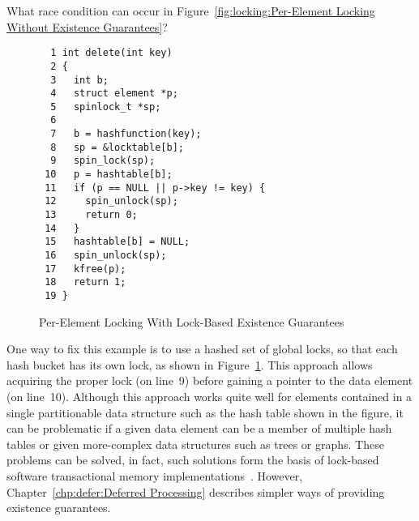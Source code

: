 \QuickQuiz{}
	What race condition can occur in
	Figure~\ref{fig:locking:Per-Element Locking Without Existence Guarantees}?
 \QuickQuizEnd

\begin{figure}[tbp]
{ \scriptsize
\begin{verbatim}
  1 int delete(int key)
  2 {
  3   int b;
  4   struct element *p;
  5   spinlock_t *sp;
  6
  7   b = hashfunction(key);
  8   sp = &locktable[b];
  9   spin_lock(sp);
 10   p = hashtable[b];
 11   if (p == NULL || p->key != key) {
 12     spin_unlock(sp);
 13     return 0;
 14   }
 15   hashtable[b] = NULL;
 16   spin_unlock(sp);
 17   kfree(p);
 18   return 1;
 19 }
\end{verbatim}
}
\caption{Per-Element Locking With Lock-Based Existence Guarantees}
\label{fig:locking:Per-Element Locking With Lock-Based Existence Guarantees}
\end{figure}

One way to fix this example is to use a hashed set of global locks, so
that each hash bucket has its own lock, as shown in
Figure~\ref{fig:locking:Per-Element Locking With Lock-Based Existence Guarantees}.
This approach allows acquiring the proper lock (on line~9) before
gaining a pointer to the data element (on line~10).
Although this approach works quite well for elements contained in a
single partitionable data structure such as the hash table shown in the
figure, it can be problematic if a given data element can be a member
of multiple hash tables or given more-complex data structures such
as trees or graphs.
These problems can be solved, in fact, such solutions form the basis
of lock-based software transactional memory
implementations~\cite{Shavit95,DaveDice2006DISC}.
However,
Chapter~\ref{chp:defer:Deferred Processing}
describes simpler ways of providing existence guarantees.
